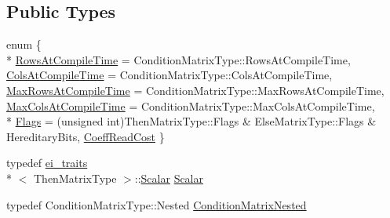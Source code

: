 \subsection*{Public Types}
\begin{DoxyCompactItemize}
\item 
enum \{ \\*
\hyperlink{structei__traits_3_01_select_3_01_condition_matrix_type_00_01_then_matrix_type_00_01_else_matrix_type_01_4_01_4_ad47d71b728e8f53706df432a3b25ff74a7a501865378527ee2e29d4e7b8d6cc44}{Rows\-At\-Compile\-Time} = Condition\-Matrix\-Type\-:\-:Rows\-At\-Compile\-Time, 
\hyperlink{structei__traits_3_01_select_3_01_condition_matrix_type_00_01_then_matrix_type_00_01_else_matrix_type_01_4_01_4_ad47d71b728e8f53706df432a3b25ff74a45931f2b60350b93998476d8c1c5fa33}{Cols\-At\-Compile\-Time} = Condition\-Matrix\-Type\-:\-:Cols\-At\-Compile\-Time, 
\hyperlink{structei__traits_3_01_select_3_01_condition_matrix_type_00_01_then_matrix_type_00_01_else_matrix_type_01_4_01_4_ad47d71b728e8f53706df432a3b25ff74a633c2b1be1f6fb1664005d921d09c435}{Max\-Rows\-At\-Compile\-Time} = Condition\-Matrix\-Type\-:\-:Max\-Rows\-At\-Compile\-Time, 
\hyperlink{structei__traits_3_01_select_3_01_condition_matrix_type_00_01_then_matrix_type_00_01_else_matrix_type_01_4_01_4_ad47d71b728e8f53706df432a3b25ff74a19a10ce184ba2991244bd1e943c27e4c}{Max\-Cols\-At\-Compile\-Time} = Condition\-Matrix\-Type\-:\-:Max\-Cols\-At\-Compile\-Time, 
\\*
\hyperlink{structei__traits_3_01_select_3_01_condition_matrix_type_00_01_then_matrix_type_00_01_else_matrix_type_01_4_01_4_ad47d71b728e8f53706df432a3b25ff74a5232c45be2355dfd025a2e445387bb28}{Flags} = (unsigned int)Then\-Matrix\-Type\-:\-:Flags \& Else\-Matrix\-Type\-:\-:Flags \& Hereditary\-Bits, 
\hyperlink{structei__traits_3_01_select_3_01_condition_matrix_type_00_01_then_matrix_type_00_01_else_matrix_type_01_4_01_4_ad47d71b728e8f53706df432a3b25ff74ad7a1c411607f780af9054555dcbf7b2b}{Coeff\-Read\-Cost}
 \}
\item 
typedef \hyperlink{structei__traits}{ei\-\_\-traits}\\*
$<$ Then\-Matrix\-Type $>$\-::\hyperlink{structei__traits_3_01_select_3_01_condition_matrix_type_00_01_then_matrix_type_00_01_else_matrix_type_01_4_01_4_a70e3e22378bef648a471e7ed33aedaf2}{Scalar} \hyperlink{structei__traits_3_01_select_3_01_condition_matrix_type_00_01_then_matrix_type_00_01_else_matrix_type_01_4_01_4_a70e3e22378bef648a471e7ed33aedaf2}{Scalar}
\item 
typedef Condition\-Matrix\-Type\-::\-Nested \hyperlink{structei__traits_3_01_select_3_01_condition_matrix_type_00_01_then_matrix_type_00_01_else_matrix_type_01_4_01_4_a6db58585d683bd9ed75f665f8d5418f4}{Condition\-Matrix\-Nested}

\end{DoxyCompactItemize}
